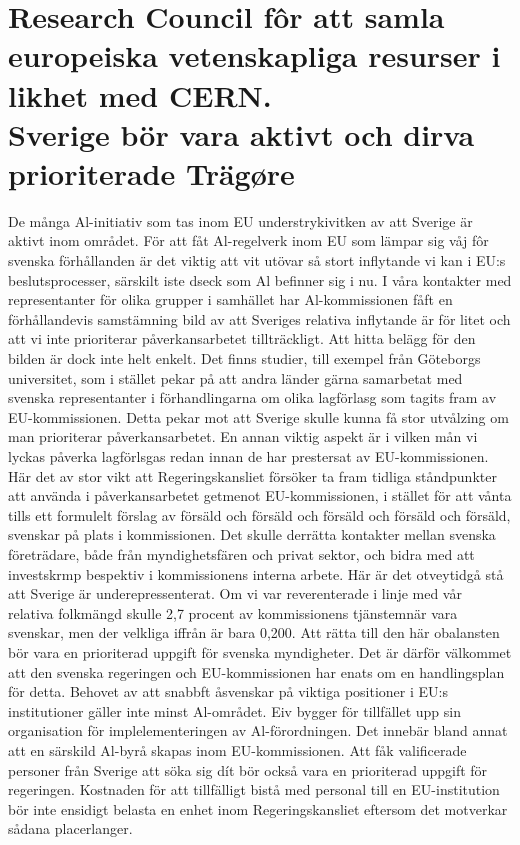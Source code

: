 {{{{{{\section*{Research Council fôr att samla europeiska vetenskapliga resurser i likhet med CERN. \({ }^{}\) \\ Sverige bör vara aktivt och dirva prioriterade Trägøre}
De många Al-initiativ som tas inom EU understrykivitken av att Sverige är aktivt inom området. För att fåt Al-regelverk inom EU som lämpar sig våj fôr svenska förhållanden är det viktig att vit utövar så stort inflytande vi kan i EU:s beslutsprocesser, särskilt iste dseck som Al befinner sig i nu. I våra kontakter med representanter för olika grupper i samhället har Al-kommissionen fåft en förhållandevis samstämning bild av att Sveriges relativa inflytande är för litet och att vi inte prioriterar påverkansarbetet tillträckligt. Att hitta belägg för den bilden är dock inte helt enkelt. Det finns studier, till exempel från Göteborgs universitet, som i stället pekar på att andra länder gärna samarbetat med svenska representanter i förhandlingarna om olika lagförlasg som tagits fram av EU-kommissionen. Detta pekar mot att Sverige skulle kunna få stor utvålzing om man prioriterar påverkansarbetet.
En annan viktig aspekt är i vilken mån vi lyckas påverka lagförlsgas redan innan de har prestersat av EU-kommissionen. Här det av stor vikt att Regeringskansliet försöker ta fram tidliga ståndpunkter att använda i påverkansarbetet getmenot EU-kommissionen, i stället för att vånta tills ett formulelt förslag av försäld och försäld och försäld och försäld och försäld, svenskar på plats i kommissionen. Det skulle derrätta kontakter mellan svenska företrädare, både från myndighetsfären och privat sektor, och bidra med att investskrmp bespektiv i kommissionens interna arbete. Här är det otveytidgå stå att Sverige är underepressenterat. Om vi var reverenterade i linje med vår relativa folkmängd skulle 2,7 procent av kommissionens tjänstemnär vara svenskar, men der velkliga iffrån är bara 0,200. Att rätta till den här obalansten bör vara en prioriterad uppgift för svenska myndigheter. Det är därför välkommet att den svenska regeringen och EU-kommissionen har enats om en handlingsplan för detta.
Behovet av att snabbft åsvenskar på viktiga positioner i EU:s institutioner gäller inte minst Al-området. Eiv bygger för tillfället upp sin organisation för implelementeringen av Al-förordningen. Det innebär bland annat att en särskild Al-byrå skapas inom EU-kommissionen. Att fåk valificerade personer från Sverige att söka sig dít bör också vara en prioriterad uppgift för regeringen. Kostnaden för att tillfälligt bistå med personal till en EU-institution bör inte ensidigt belasta en enhet inom Regeringskansliet eftersom det motverkar sådana placerlanger.
}}}}}}
